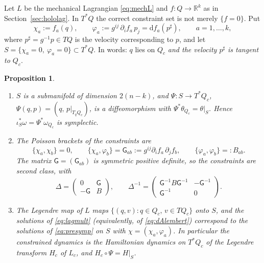 \documentclass[11pt,a4paper]{article}
\numberwithin{equation}{section}
\theoremstyle{plain}
\newtheorem{proposition}[theorem]{Proposition}
\theoremstyle{definition}
\theoremstyle{remark}
\newcommand{\R}{\mathbb{R}}
\newcommand{\pb}[2]{\{#1,#2\}}
\newcommand{\dd}{\mathrm{d}}
\newcommand{\inv}{^{-1}}
\begin{document}
Let $L$ be the mechanical Lagrangian \eqref{eq:mechL} and $f:Q\to\R^k$ as in Section~\ref{sec:hololag}. In $T^*Q$ the correct constraint set is not merely $\{f=0\}$. Put
\begin{equation}\label{eq:chi-phi}
\chi_a:=f_a(q),\qquad \varphi_a:=g^{ij}\,\partial_if_a\,p_j=\dd f_a(p^\sharp),\qquad a=1,\dots,k,
\end{equation}
where $p^\sharp=g\inv p\in TQ$ is the velocity corresponding to $p$, and let $S=\{\chi_a=0,\ \varphi_a=0\}\subset T^*Q$. In words: $q$ lies on $Q_c$ \emph{and the velocity $p^\sharp$ is tangent to $Q_c$}.

\begin{proposition}\label{prop:holoham}
\begin{enumerate}[label=(\roman*)]
\item $S$ is a submanifold of dimension $2(n-k)$, and $\Psi:S\to T^*Q_c$, $\Psi(q,p)=(q,\,p|_{T_qQ_c})$, is a diffeomorphism with $\Psi^*\theta_{Q_c}=\theta|_S$. Hence $\iota_S^*\omega=\Psi^*\omega_{Q_c}$ is symplectic.
\item The Poisson brackets of the constraints are
\begin{equation}\label{eq:holoPB}
\pb{\chi_a}{\chi_b}=0,\qquad\pb{\chi_a}{\varphi_b}=\mathsf G_{ab}:=g^{ij}\partial_if_a\,\partial_jf_b,\qquad \pb{\varphi_a}{\varphi_b}=:B_{ab}.
\end{equation}
The matrix $\mathsf G=(\mathsf G_{ab})$ is symmetric positive definite, so the constraints are second class, with
\begin{equation}\label{eq:holoDelta}
\Delta=\begin{pmatrix}0&\mathsf G\\-\mathsf G&B\end{pmatrix},\qquad
\Delta^{-1}=\begin{pmatrix}\mathsf G\inv B\mathsf G\inv&-\mathsf G\inv\\ \mathsf G\inv&0\end{pmatrix}.
\end{equation}
\item The Legendre map of $L$ maps $\{(q,v):q\in Q_c,\,v\in TQ_c\}$ onto $S$, and the solutions of \eqref{eq:lagmult} (equivalently, of \eqref{eq:dAlembert}) correspond to the solutions of \eqref{eq:presymp} on $S$ with $\chi=(\chi_a,\varphi_a)$. In particular the constrained dynamics is the Hamiltonian dynamics on $T^*Q_c$ of the Legendre transform $H_c$ of $L_c$, and $H_c\circ\Psi=H|_S$.
\end{enumerate}
\end{proposition}
\end{document}
